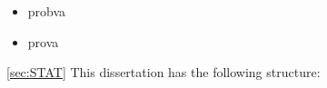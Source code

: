 

\label{sec:introduction}

\lipsum

\begin{itemize}
    \item probva
    \item prova
\end{itemize}
\cite{Higgs_discovery_2012_CMS,Higgs_discovery_2012_ATLAS,Higgs_discovery_2013_CMS}
\ref{sec:STAT}
This dissertation has the following structure:
